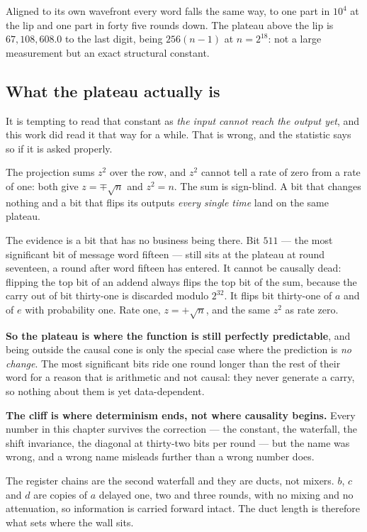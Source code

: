 Aligned to its own wavefront every word falls the same way, to one part in \(10^{4}\) at the lip and
one part in forty five rounds down. The plateau above the lip is \(67{,}108{,}608.0\) to the last
digit, being \(256(n-1)\) at \(n = 2^{18}\): not a large measurement but an exact structural
constant.

\subsection{What the plateau actually is}

It is tempting to read that constant as \emph{the input cannot reach the output yet}, and this work
did read it that way for a while. That is wrong, and the statistic says so if it is asked properly.

The projection sums \(z^{2}\) over the row, and \(z^{2}\) cannot tell a rate of zero from a rate of
one: both give \(z = \mp\sqrt{n}\) and \(z^{2} = n\). The sum is sign-blind. A bit that changes
nothing and a bit that flips its outputs \emph{every single time} land on the same plateau.

The evidence is a bit that has no business being there. Bit \(511\) --- the most significant bit of
message word fifteen --- still sits at the plateau at round seventeen, a round after word fifteen
has entered. It cannot be causally dead: flipping the top bit of an addend always flips the top bit
of the sum, because the carry out of bit thirty-one is discarded modulo \(2^{32}\). It flips bit
thirty-one of \(a\) and of \(e\) with probability one. Rate one, \(z = +\sqrt{n}\), and the same
\(z^{2}\) as rate zero.

\textbf{So the plateau is where the function is still perfectly predictable}, and being outside the
causal cone is only the special case where the prediction is \emph{no change}. The most significant
bits ride one round longer than the rest of their word for a reason that is arithmetic and not
causal: they never generate a carry, so nothing about them is yet data-dependent.

\textbf{The cliff is where determinism ends, not where causality begins.} Every number in this
chapter survives the correction --- the constant, the waterfall, the shift invariance, the diagonal
at thirty-two bits per round --- but the name was wrong, and a wrong name misleads further than a
wrong number does.

The register chains are the second waterfall and they are ducts, not mixers. \(b\), \(c\)
and \(d\) are copies of \(a\) delayed one, two and three rounds, with no mixing and no attenuation,
so information is carried forward intact. The duct length is therefore what sets where the wall
sits.

